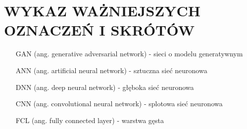 \section*{WYKAZ WAŻNIEJSZYCH OZNACZEŃ I SKRÓTÓW}

  \bigskip

  \begin{itemize}
    \item[GAN] (ang. generative adversarial network) - sieci o modelu generatywnym
    \item[ANN] (ang. artificial neural network) - sztuczna sieć neuronowa
    \item[DNN] (ang. deep neural network) - głęboka sieć neuronowa
    \item[CNN] (ang. convolutional neural network) - splotowa sieć neuronowa
    \item[FCL] (ang. fully connected layer) - warstwa gęsta
  \end{itemize}
